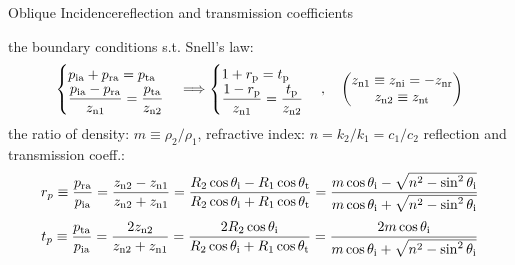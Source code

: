 \documentclass[9pt,mathserif]{beamer}
\begin{document}
\begin{frame}{Oblique Incidence}{reflection and transmission coefficients}
	\begin{outline}
		\1 the boundary conditions s.t. Snell's law:
		$$ 
		\begin{cases}
			p_\text{ia}+p_\text{ra}=p_\text{ta}\\
			\displaystyle \frac{p_\text{ia} - p\st{ra}}{z_\text{n1}} = 
			\frac{p\st{ta}}{z_\text{n2}}
		\end{cases}	
		\imp 
		\begin{cases}
			1+r\st{p}=t\st{p}\\
			\displaystyle \frac{1-r\st{p}}{z_\text{n1}} = \frac{t\st{p}}{z_\text{n2}}
		\end{cases}	
		\qc
		\qty(
		\begin{matrix}
			z_\text{n1}\equiv z\st{ni}=-z\st{nr}\\
			z_\text{n2}\equiv z\st{nt}
		\end{matrix}	
		)
		$$
		\1 the ratio of density: $m\equiv \rho_2/\rho_1$, refractive index: $n=k_2/k_1=c_1/c_2$
		\1 reflection and transmission coeff.:
		$$
		r_p\equiv\frac{p_\text{ra}}{p_\text{ia}} = \frac{z_\text{n2}-z_\text{n1}}{z_\text{n2}+z_\text{n1}} = \frac{R_2\cos\theta_\text{i}-R_1\cos\theta_\text{t}}{R_2\cos\theta_\text{i}+R_1\cos\theta_\text{t}}=\frac{m\cos\theta_\text{i}-
		\sqrt{n^2-\sin^2\theta_\text{i}}}{m\cos\theta_\text{i}
		+\sqrt{n^2-\sin^2\theta_\text{i}}}
		$$
		$$
		t_p\equiv\frac{p_\text{ta}}{p_\text{ia}} = 
		\frac{2z_\text{n2}}{z_\text{n2}+z_\text{n1}} = 
		\frac{2R_2\cos\theta_\text{i}}{R_2\cos\theta_\text{i}+
		R_1\cos\theta_\text{t}}=\frac{2m\cos\theta_\text{i}}{m\cos\theta_\text{i}+
		\sqrt{n^2-\sin^2\theta_\text{i}}}
		$$
	\end{outline}
\end{frame}
\end{document}
